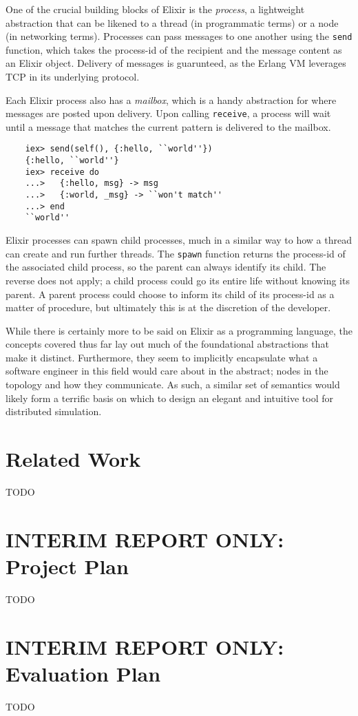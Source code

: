 One of the crucial building blocks of Elixir is the \emph{process}, a lightweight abstraction that can be likened to
a thread (in programmatic terms) or a node (in networking terms)\cite{elixir_processes}. Processes can pass messages
to one another using the \texttt{send} function, which takes the process-id of the recipient and the message content as
an Elixir object. Delivery of messages is guarunteed, as the Erlang VM leverages TCP in its underlying
protocol\cite{erlang_protocol}.

Each Elixir process also has a \emph{mailbox}, which is a handy abstraction for where messages are posted upon
delivery. Upon calling \texttt{receive}, a process will wait until a message that matches the current pattern is
delivered to the mailbox.

\begin{lstlisting}
    iex> send(self(), {:hello, ``world''})
    {:hello, ``world''}
    iex> receive do
    ...>   {:hello, msg} -> msg
    ...>   {:world, _msg} -> ``won't match''
    ...> end
    ``world''
\end{lstlisting}

Elixir processes can spawn child processes, much in a similar way to how a thread can create and run further threads.
The \texttt{spawn} function returns the process-id of the associated child process, so the parent can always identify
its child. The reverse does not apply; a child process could go its entire life without knowing its parent. A parent
process could choose to inform its child of its process-id as a matter of procedure, but ultimately this is at the
discretion of the developer.

While there is certainly more to be said on Elixir as a programming language, the concepts covered thus far lay out
much of the foundational abstractions that make it distinct. Furthermore, they seem to implicitly encapsulate what a
software engineer in this field would care about in the abstract; nodes in the topology and how they communicate.
As such, a similar set of semantics would likely form a terrific basis on which to design an elegant and intuitive
tool for distributed simulation.


\section{Related Work}

TODO


\section{INTERIM REPORT ONLY: Project Plan}

TODO


\section{INTERIM REPORT ONLY: Evaluation Plan}

TODO
